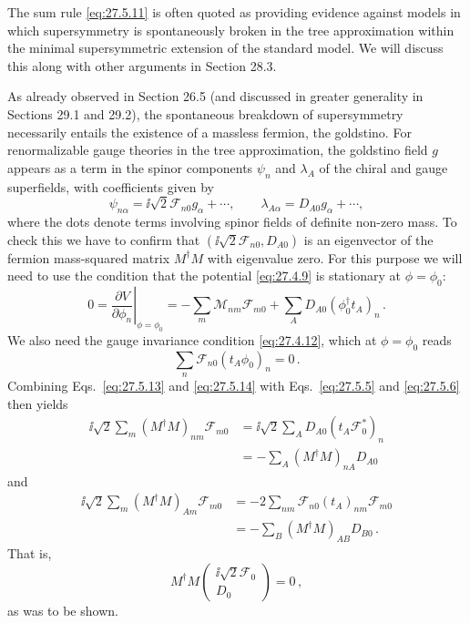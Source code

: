 The sum rule \eqref{eq:27.5.11} is often quoted as providing evidence
against models in which supersymmetry is spontaneously broken in the tree
approximation within the minimal supersymmetric extension of the standard
model. We will discuss this along with other arguments in Section 28.3.

As already observed in Section 26.5 (and discussed in greater generality in
Sections 29.1 and 29.2), the spontaneous breakdown of supersymmetry
necessarily entails the existence of a massless fermion, the goldstino. For
renormalizable gauge theories in the tree approximation, the goldstino field
\(g\) appears as a term in the spinor components \(\psi_n\) and \(\lambda_A\)
of the chiral and gauge superfields, with coefficients given by
\begin{equation}
  \psi_{n\alpha}=\ii\sqrt{2}\mathcal{F}_{n0}g_\alpha+\cdots,
  \qquad
  \lambda_{A\alpha}=D_{A0}g_\alpha+\cdots,
  \tag{27.5.12}\label{eq:27.5.12}
\end{equation}
where the dots denote terms involving spinor fields of definite non-zero
mass. To check this we have to confirm that
\((\ii\sqrt{2}\mathcal{F}_{n0},D_{A0})\) is an eigenvector of the fermion
mass-squared matrix \(M^\dagger M\) with eigenvalue zero. For this purpose we
will need to use the condition that the potential \eqref{eq:27.4.9} is
stationary at \(\phi=\phi_0\):
\begin{equation}
  0
  =\left.\frac{\partial V}{\partial\phi_n}\right|_{\phi=\phi_0}
  =-\sum_m\mathcal{M}_{nm}\mathcal{F}_{m0}
  +\sum_A D_{A0}(\phi_0^\dagger t_A)_n\,.
  \tag{27.5.13}\label{eq:27.5.13}
\end{equation}
We also need the gauge invariance condition \eqref{eq:27.4.12}, which at
\(\phi=\phi_0\) reads
\begin{equation}
  \sum_n\mathcal{F}_{n0}(t_A\phi_0)_n=0\,.
  \tag{27.5.14}\label{eq:27.5.14}
\end{equation}
Combining Eqs.~\eqref{eq:27.5.13} and \eqref{eq:27.5.14} with
Eqs.~\eqref{eq:27.5.5} and \eqref{eq:27.5.6} then yields
\begin{equation}
  \begin{aligned}
  \ii\sqrt{2}\sum_m(M^\dagger M)_{nm}\mathcal{F}_{m0}
  &=\ii\sqrt{2}\sum_A D_{A0}(t_A\mathcal{F}_0^*)_n
  \\
  &=-\sum_A(M^\dagger M)_{nA}D_{A0}
  \end{aligned}
  \tag{27.5.15}\label{eq:27.5.15}
\end{equation}
and
\begin{equation}
  \begin{aligned}
  \ii\sqrt{2}\sum_m(M^\dagger M)_{Am}\mathcal{F}_{m0}
  &=-2\sum_{nm}\mathcal{F}_{n0}(t_A)_{nm}\mathcal{F}_{m0}
  \\
  &=-\sum_B(M^\dagger M)_{AB}D_{B0}\,.
  \end{aligned}
  \tag{27.5.16}\label{eq:27.5.16}
\end{equation}
That is,
\begin{equation}
  M^\dagger M
  \begin{pmatrix}
    \ii\sqrt{2}\mathcal{F}_0\\
    D_0
  \end{pmatrix}
  =0\,,
  \tag{27.5.17}\label{eq:27.5.17}
\end{equation}
as was to be shown.
